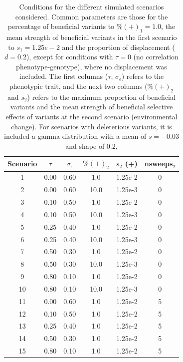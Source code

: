 \documentclass[a4paper,11pt]{article}
\begin{document}
 
\begin{table}[h]
\begin{center}\begin{tabular}{cccccc}
Scenario & $\tau$ & $\sigma_{\epsilon}$ & $\%(+)_2$ & $s_2$ (+) & nsweeps$_2$ \\
\hline
1  & 0.00 & 0.60& 1.0   & 1.25e-2 &  0\\
2  & 0.00 & 0.60 & 10.0 & 1.25e-3 & 0\\
3  & 0.10 & 0.50 & 1.0   & 1.25e-2 & 0\\
4  & 0.10 & 0.50 & 10.0 & 1.25e-3 & 0\\
5  & 0.25 & 0.40 & 1.0   & 1.25e-2 & 0\\
6  & 0.25 & 0.40 & 10.0 & 1.25e-3 & 0\\
7  & 0.50 & 0.30 & 1.0   & 1.25e-2 & 0\\
8  & 0.50 & 0.30 & 10.0 & 1.25e-3 & 0\\
9  & 0.80 & 0.10 & 1.0   & 1.25e-2 & 0\\
10 & 0.80 & 0.10 & 10.0 & 1.25e-3 & 0\\
11  & 0.00 & 0.60& 1.0   & 1.25e-2 & 5\\
12  & 0.10 & 0.50 & 1.0   & 1.25e-2 & 5\\
13  & 0.25 & 0.40 & 1.0   & 1.25e-2 & 5\\
14  & 0.50 & 0.30 & 1.0   & 1.25e-2 & 5\\
15  & 0.80 & 0.10 & 1.0   & 1.25e-2 & 5\\
\hline
\end{tabular} 
\caption{Conditions for the different simulated scenarios considered. %
Common parameters are those for the percentage of beneficial variants to $\%(+)_1=1.0$, the mean strength of beneficial variants in the first scenario to $s_1=1.25e-2$ and the proportion of displacement ($d=0.2$), except for conditions with $\tau=0$ (no correlation phenotype-genotype), where no displacement was included. The first columns ($\tau$, $\sigma_{\epsilon}$) refers to the phenotypic trait, and the next two columns ($\%(+)_2$ and $s_2$) refers to the maximum proportion of beneficial variants and the mean strength of beneficial selective effects of variants at the second scenario (environmental change). For scenarios with deleterious variants, it is included a gamma distribution with a mean of $s=-0.03$ and shape of 0.2, }
\label{tablescen}
\end{center}
\end{table}
\end{document}
